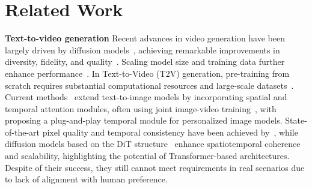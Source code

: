 \section{Related Work}
\label{sec:related_work}

\noindent\textbf{Text-to-video generation}
Recent advances in video generation have been largely driven by diffusion models~\cite{ho2020denoisingdiffusionprobabilisticmodels,Sohl-Dickstein_Weiss_Maheswaranathan_Ganguli_2015,Song_Meng_Ermon_2020,Zhang_Tao_Chen_2022}, achieving remarkable improvements in diversity, fidelity, and quality~\cite{chen2023seineshorttolongvideodiffusion,esser2023structurecontentguidedvideosynthesis,ho2022videodiffusionmodels,liu2023dualstreamdiffusionnettexttovideo,ruan2023mmdiffusionlearningmultimodaldiffusion,wang2024swapattentionspatiotemporaldiffusions,xing2023simdasimplediffusionadapter}. Scaling model size and training data further enhance performance~\cite{Ho_Chan_Saharia_Whang_Gao_Gritsenko_Kingma_Poole_Norouzi_Fleet_et,Singer_Polyak_Hayes_Yin_An_Zhang_Hu_Yang_Ashual_Gafni_et,Wu_Huang_Zhang_Li_Ji_Yang_Sapiro_Duan_2021}. In Text-to-Video (T2V) generation, pre-training from scratch requires substantial computational resources and large-scale datasets~\cite{gen3,luma,kling,brooks2024video,kong2024hunyuanvideo}. Current methods~\cite{blattmann2023alignlatentshighresolutionvideo,wang2023modelscopetexttovideotechnicalreport,guo2024animatediffanimatepersonalizedtexttoimage} extend text-to-image models by incorporating spatial and temporal attention modules, often using joint image-video training~\cite{ma2024lattelatentdiffusiontransformer}, with~\cite{guo2024animatediffanimatepersonalizedtexttoimage} proposing a plug-and-play temporal module for personalized image models. State-of-the-art pixel quality and temporal consistency have been achieved by~\cite{Zhang_Wang_Zhang_Zhao_Yuan_Qin_Wang_Zhao_Zhou_Group,Chen_Zhang_Cun_Xia_Wang_Weng_Shan_2024}, while diffusion models based on the DiT structure~\cite{brooks2024video,yang2024cogvideox,Chen_Zhang_Cun_Xia_Wang_Weng_Shan_2024} enhance spatiotemporal coherence and scalability, highlighting the potential of Transformer-based architectures. Despite of their success, they still cannot meet requirements in real scenarios due to lack of alignment with human preference.

